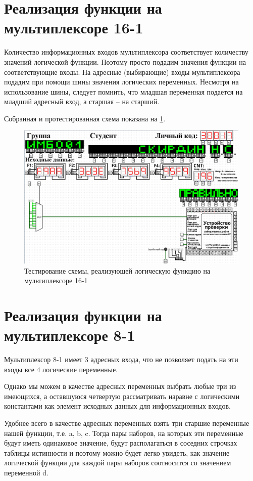 \documentclass[14pt, a4paper]{extreport}
\begin{document}
\section{Реализация функции на мультиплексоре 16-1}
Количество информационных входов мультиплексора соответствует количеству значений логической функции. Поэтому просто подадим значения функции на соответствующие входы. На адресные (выбирающие) входы мультиплексора подадим при помощи шины значения логических переменных. Несмотря на использование шины, следует помнить, что младшая переменная подается на младший адресный вход, а старшая – на старший.

Собранная и протестированная схема показана на \cref{fig:multiplexer-16-1}.

\begin{figure}[H]
	\caption{Тестирование схемы, реализующей логическую функцию на мультиплексоре 16-1}
	\label{fig:multiplexer-16-1}
	\includegraphics[width=\textwidth]{multiplexer-16-1}
\end{figure}

\section{Реализация функции на мультиплексоре 8-1}
Мультиплексор 8-1 имеет 3 адресных входа, что не позволяет подать на эти входы все 4 логические переменные.

Однако мы можем в качестве адресных переменных выбрать любые три из имеющихся, а оставшуюся четвертую рассматривать наравне с логическими константами как элемент исходных данных для информационных входов.

Удобнее всего в качестве адресных переменных взять три старшие переменные нашей функции, т.е. a, b, c. Тогда пары наборов, на которых эти переменные будут иметь одинаковое значение, будут располагаться в соседних строчках таблицы истинности и поэтому можно будет легко увидеть, как значение логической функции для каждой пары наборов соотносится со значением переменной d.
\end{document}
